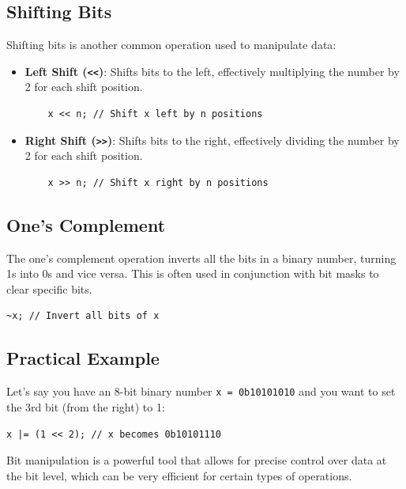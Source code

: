 \documentclass{article}
\begin{document}
\subsection*{Shifting Bits}
Shifting bits is another common operation used to manipulate data:

\begin{itemize}
    \item \textbf{Left Shift (\texttt{<<})}: Shifts bits to the left, effectively multiplying the number by 2 for each shift position.
    \begin{verbatim}
    x << n; // Shift x left by n positions
    \end{verbatim}
    
    \item \textbf{Right Shift (\texttt{>>})}: Shifts bits to the right, effectively dividing the number by 2 for each shift position.
    \begin{verbatim}
    x >> n; // Shift x right by n positions
    \end{verbatim}
\end{itemize}

\subsection*{One's Complement}
The one's complement operation inverts all the bits in a binary number, turning 1s into 0s and vice versa. This is often used in conjunction with bit masks to clear specific bits.
\begin{verbatim}
~x; // Invert all bits of x
\end{verbatim}

\subsection*{Practical Example}
Let's say you have an 8-bit binary number \texttt{x = 0b10101010} and you want to set the 3rd bit (from the right) to 1:
\begin{verbatim}
x |= (1 << 2); // x becomes 0b10101110
\end{verbatim}

Bit manipulation is a powerful tool that allows for precise control over data at the bit level, which can be very efficient for certain types of operations.
\end{document}
